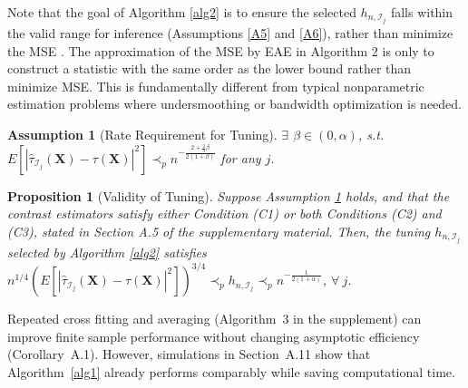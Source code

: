 \documentclass[11pt]{article}
\theoremstyle{referenceplain}
\newtheorem{Proposition}{Proposition}
\newtheorem{Assumption}{Assumption}
\theoremstyle{referencedefinition}
\theoremstyle{referenceremark}
\begin{document}
Note that the goal of Algorithm \ref{alg2} is to ensure the selected $h_{n,\mathcal{I}_j}$ falls within the valid range for inference (Assumptions \ref{A5} and \ref{A6}), rather than minimize the MSE \citep{su2020adaptive}. The approximation of the MSE by EAE in Algorithm 2 is only to construct a statistic with the same order as the lower bound rather than minimize MSE. This is fundamentally different from typical nonparametric estimation problems where undersmoothing or bandwidth optimization is needed.

\begin{Assumption}[Rate Requirement for Tuning]\label{A9}
    $\exists$ $\beta\in(0,\alpha)$, s.t. $ E[|\widehat{\tau}_{\mathcal{I}_j}(\mathbf{X})-\tau(\mathbf{X})|^2]\prec_p n^{-\frac{2+\frac{2}{3}\beta}{2(1+\beta)}}$ for any $j$. 
\end{Assumption}
\begin{Proposition}[Validity of Tuning]\label{tuntheory}
Suppose Assumption \ref{A9} holds, and that the contrast estimators satisfy either Condition (C1) or both Conditions (C2) and (C3), stated in Section A.5 of the supplementary material. Then, the tuning $h_{n,\mathcal{I}_j}$ selected by Algorithm \ref{alg2} satisfies
$n^{1/4}\left(E[|\widehat{\tau}_{\mathcal{I}_j}(\mathbf{X})-\tau(\mathbf{X})|^2]\right)^{3/4}\prec_p h_{n,\mathcal{I}_j}\prec_p n^{-\frac{1}{2(1+\alpha)}}$, $\forall~j$.
\end{Proposition}
Repeated cross fitting and averaging (Algorithm~3 in the supplement) 
can improve finite sample performance without changing asymptotic 
efficiency (Corollary~A.1). However, simulations in Section~A.11 
show that Algorithm~\ref{alg1} already performs comparably while 
saving computational time.
\end{document}
